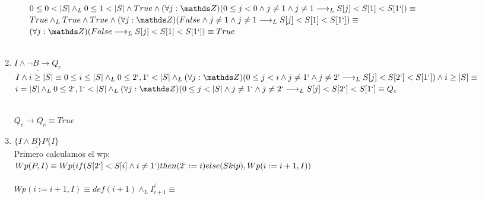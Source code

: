 \documentclass[10pt,a4paper]{article}
\begin{document}
\begin{enumerate}
\begin{itemize}
            $0\leq 0< |S| \land_L 0\leq 1 < |S| \land True \land (\forall j : \ent)(0\leq j < 0 \land j\neq 1 \land j \neq 1 \longrightarrow_L S[j]<S[1]<S[1`]) \equiv$ \\

            $True \land_L True \land True \land (\forall j : \ent)(False \land j\neq 1 \land j \neq 1 \longrightarrow_L S[j]<S[1]<S[1`]) \equiv$ \\

            $(\forall j : \ent)(False \longrightarrow_L S[j]<S[1]<S[1`]) \equiv True$\\
            \\

        \end{itemize}
        
        
    \item  $\underline{I\land \neg B \longrightarrow Q_c }$\\
        $I \land i\geq |S| \equiv 0\leq i\leq |S| \land_L 0\leq 2` , 1` < |S| \land_L (\forall j : \ent)(0\leq j < i \land j\neq 1` \land j \neq 2`\longrightarrow_L S[j]<S[2`]<S[1`]) \land i\geq |S| \equiv$\\
        $ i= |S| \land_L 0\leq 2` , 1` < |S| \land_L (\forall j : \ent)(0\leq j < |S| \land j\neq 1` \land j \neq 2`\longrightarrow_L S[j]<S[2`]<S[1`] \equiv Q_c$

        \\
        $Q_c \longrightarrow Q_c \equiv True$

        
    
    \item $\underline{\{ I \land B \}P \{ I \}}$\\
    
        {Primero calculamos el wp:}\\
        
        $Wp(P,I)\equiv Wp(if (S[2`]<S[i] \land i\neq 1`) then (2`:=i) else (Skip), Wp(i:=i+1,I))$\\

        \\
        
        $Wp(i:=i+1,I)\equiv def(i+1) \land_L I^{i}_{i+1} \equiv$\\
        

\end{enumerate}
\end{document}
